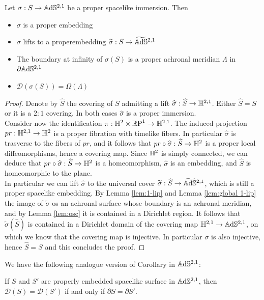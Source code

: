 \begin{proposition}\label{prop:surface in ads}
    Let $\sigma : S \to \mathbb{A}\mathrm{d}\mathbb{S}^{2,1}$ be a proper spacelike immersion. Then
    \begin{itemize}
        \item $\sigma$ is a proper embedding
        \item $\sigma$ lifts to a properembedding $\widetilde{\sigma}: S \to \widetilde{\mathbb{A}\mathrm{d}\mathbb{S}}{}^{2,1}$
        \item The boundary at infinity of $\sigma(S)$ is a proper achronal meridian $\Lambda$ in $\partial\mathbb{A}\mathrm{d}\mathbb{S}^{2,1}$
        \item $\mathcal{D}(\sigma(S)) = \Omega(\Lambda)$
    \end{itemize}
\end{proposition}
\begin{proof}
    Denote by $\widehat{S}$ the covering of $S$ admitting a lift $\widehat{\sigma}: \widehat{S} \to \mathbb{H}^{2,1}$. Either $\widehat{S}=S$ or it is a $2:1$ covering. In both cases $\widehat{\sigma}$ is a proper immersion.\\
    Consider now the identification $\pi : \mathbb{H}^2 \times \mathbb{R}\textup{P}^1 \to \mathbb{H}^{2,1}$. The induced projection $pr:\mathbb{H}^{2,1} \to \mathbb{H}^2$ is a proper fibration with timelike fibers. In particular $\widehat{\sigma}$ is trasverse to the fibers of $pr$, and it follows that $pr \circ \widehat{\sigma}: \widehat{S} \to \mathbb{H}^2$ is a proper local diffeomorphisms, hence a covering map. Since $\mathbb{H}^2$ is simply connected, we can deduce that $pr \circ \widehat{\sigma}: \widehat{S} \to \mathbb{H}^2$ is a homeomorphism, $\widehat{\sigma}$ is an embedding, and $\widehat{S}$ is homeomorphic to the plane.\\
    In particular we can lift $\widehat{\sigma}$ to the universal cover $\widetilde{\sigma}: \widehat{S}\to\widetilde{\mathbb{A}\mathrm{d}\mathbb{S}}{}^{2,1}$, which is still a proper spacelike embedding. By Lemma \ref{lem:1-lip} and Lemma \ref{lem:global 1-lip} the image of $\widetilde{\sigma}$ os an achronal surface whose boundary is an achronal meridian, and by Lemma \ref{lem:osc} it is contained in a Dirichlet region. It follows that $\widetilde{\sigma}(\widehat{S})$ is contained in a Dirichlet domain of the covering map $\mathbb{H}^{2,1}\to\mathbb{A}\mathrm{d}\mathbb{S}^{2,1}$, on which we know that the covering map is injective. In particular $\sigma$ is also injective, hence $\widehat{S}=S$ and this concludes the proof.
\end{proof}
We have the following analogue version of Corollary in $\mathbb{A}\mathrm{d}\mathbb{S}^{2,1}$:
\begin{corollary}
    If $S$ and $S'$ are properly embedded spacelike surface in $\mathbb{A}\mathrm{d}\mathbb{S}^{2,1}$, then $\mathcal{D}(S) = \mathcal{D}(S')$ if and only if $\partial S = \partial S'$.
\end{corollary}


